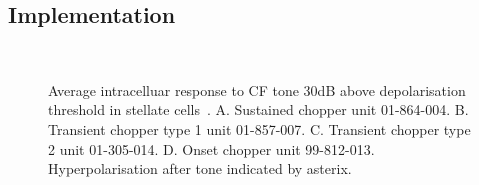 \subsection{Implementation}



\begin{figure}[htb]
  \centering
{}\quad%
\\
\quad%
\caption[Average intracelluar response data in stellate cells.]{Average
  intracelluar response to CF tone 30dB above depolarisation threshold in
  stellate
  cells~\citep[Reproduced~from~][]{PaoliniClareyEtAl:2005}. A. Sustained chopper
  unit 01-864-004. B. Transient chopper type 1 unit 01-857-007. C. Transient
  chopper type 2 unit 01-305-014. D. Onset chopper unit
  99-812-013. Hyperpolarisation after tone indicated by
  asterix.    \label{fig:PaoliniAIV}}
\end{figure}











